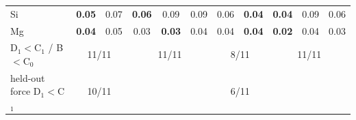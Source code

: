 \begin{table}[t]
\begin{ruledtabular}
\begin{tabular}{lcccccccccc}
Si & \textbf{0.05} & 0.07 & \textbf{0.06} & 0.09 & 0.09 & 0.06 & \textbf{0.04} & \textbf{0.04} & 0.09 & 0.06\\
Mg & \textbf{0.04} & 0.05 & 0.03 & \textbf{0.03} & 0.04 & 0.04 & \textbf{0.04} & \textbf{0.02} & 0.04 & 0.03\\
\hline
D$_1<$C$_1$ / B$<$C$_0$ & \multicolumn{2}{c}{11/11} & \multicolumn{3}{c}{11/11} & \multicolumn{2}{c}{8/11} & \multicolumn{3}{c}{11/11}\\
held-out force D$_1<$C$_1$ & \multicolumn{2}{c}{10/11} & \multicolumn{3}{c}{} & \multicolumn{2}{c}{6/11} & \multicolumn{3}{c}{}\\
\end{tabular}
\end{ruledtabular}
\end{table}
